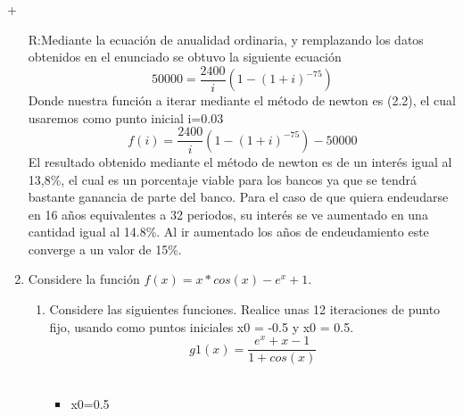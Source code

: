 +\documentclass{udpreport}
\begin{document}
\begin{enumerate}
R:Mediante la ecuación de anualidad ordinaria, y remplazando  los datos obtenidos en el enunciado se obtuvo la siguiente ecuación
\begin{equation}
    50000=\frac{2400}{i}\left(1-\left(1+i\right)^{-75}\right)
\end{equation}
Donde nuestra función a iterar mediante el método de newton es (2.2), el cual usaremos como punto inicial i=0.03
\begin{equation}
    f(i)=\frac{2400}{i}\left(1-\left(1+i\right)^{-75}\right)-50000
\end{equation}
El resultado obtenido mediante el método de newton es de un interés igual al 13,8\%, el cual es un porcentaje viable para los bancos ya que se tendrá bastante ganancia de parte del banco. Para el caso de que quiera endeudarse en 16 años equivalentes a 32 periodos, su interés se ve aumentado en una cantidad igual al 14.8\%. Al ir aumentado los años de endeudamiento este converge a un valor de 15\%.\par



\item Considere la función \(f(x) = x*cos(x)-e^x+ 1\). %
\begin{enumerate}
    
\vspace{0.9cm}
\item Considere las siguientes funciones. Realice unas 12 iteraciones de punto fijo, usando como puntos iniciales x0 = -0.5 y x0 = 0.5.\\ 


\begin{equation}
 g1(x) = \frac{e^x+x-1}
{1 + cos(x)}
\end{equation}
\\
\begin{itemize}
\item x0=0.5
\end{itemize}


\begin{table}[H]
    \centering
        \begin{tabular} { |c|c|}
        

\end{tabular}
\end{table}
\end{enumerate}
\end{enumerate}
\end{document}
